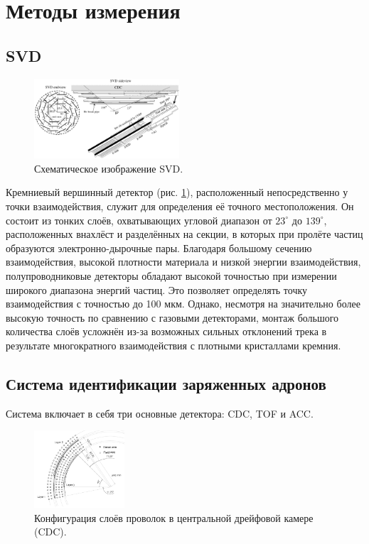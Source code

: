 \section{Методы измерения}
\subsection{SVD}

\begin{figure}
    \centering
    \includegraphics[width=0.48\textwidth]{img/SVD.png}
    \caption{Схематическое изображение SVD.}
    \label{the:SVD}
\end{figure}

Кремниевый вершинный детектор (рис. \ref{the:SVD}), расположенный непосредственно у точки взаимодействия, 
служит для определения её точного местоположения. Он состоит из тонких слоёв, охватывающих угловой диапазон от $23^\circ$ до $139^\circ$, 
расположенных внахлёст и разделённых на секции, в которых при пролёте частиц 
образуются электронно-дырочные пары. Благодаря большому сечению взаимодействия, 
высокой плотности материала и низкой энергии взаимодействия, полупроводниковые 
детекторы обладают высокой точностью при измерении широкого диапазона энергий частиц.
Это позволяет определять точку взаимодействия с точностью до 100 мкм. 
Однако, несмотря на значительно более высокую точность по сравнению с газовыми детекторами, 
монтаж большого количества слоёв усложнён из-за возможных сильных отклонений 
трека в результате многократного взаимодействия с плотными кристаллами кремния.

\subsection{Система идентификации заряженных адронов}

Система включает в себя три основные детектора: CDC, TOF и ACC.

\begin{figure}
    \centering
    \includegraphics[width=0.3\textwidth]{img/CDC.png}
    \caption{Конфигурация слоёв проволок в центральной дрейфовой камере (CDC).}
    \label{the:CDC}
\end{figure}

